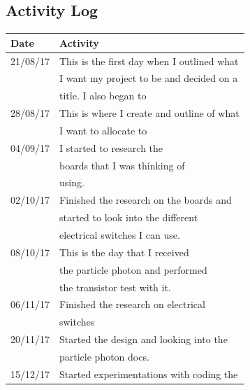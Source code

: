 \documentclass{article}
\begin{document}
\subsection{Activity Log}

\begin{tabularx}{\textwidth}{| X | X |}
    \hline
    \textbf{Date}            &               \textbf{Activity}           \\ \hline
    21/08/17                 &This is the first day when I outlined what \\
                             &I want my project to be and decided on a   \\
                             &title. I also began to \\ \hline
    28/08/17                 &This is where I create and outline of what \\
                             &I want to allocate to                      \\ \hline
    04/09/17                 &I started to research the                  \\
                             &boards that I was thinking of              \\
                             &using.                                     \\ \hline
    02/10/17                 &Finished the research on the boards and    \\
                             &started to look into the different          \\
                             &electrical switches I can use.             \\ \hline
    08/10/17                 &This is the day that I received            \\
                             &the particle photon and performed          \\
                             &the transistor test with it.               \\ \hline
    06/11/17                 &Finished the research on electrical        \\
                             &switches                                   \\ \hline
    20/11/17                 &Started the design and looking into the    \\
                             &particle photon docs.                      \\ \hline
    15/12/17                 &Started experimentations with coding the   \\

\end{tabularx}
\end{document}
